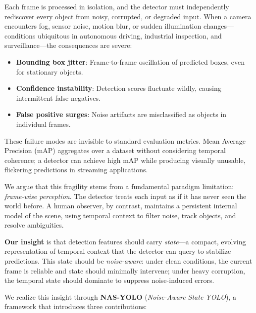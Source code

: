 \documentclass[review]{eccv2026}
\begin{document}
Each frame is processed in isolation, and the detector must independently rediscover every object from noisy, corrupted, or degraded input.
When a camera encounters fog, sensor noise, motion blur, or sudden illumination changes---conditions ubiquitous in autonomous driving, industrial inspection, and surveillance---the consequences are severe:
\begin{itemize}[leftmargin=1.5em,topsep=2pt,itemsep=1pt]
  \item \textbf{Bounding box jitter}: Frame-to-frame oscillation of predicted boxes, even for stationary objects.
  \item \textbf{Confidence instability}: Detection scores fluctuate wildly, causing intermittent false negatives.
  \item \textbf{False positive surges}: Noise artifacts are misclassified as objects in individual frames.
\end{itemize}
These failure modes are invisible to standard evaluation metrics.
Mean Average Precision (mAP) aggregates over a dataset without considering temporal coherence; a detector can achieve high mAP while producing visually unusable, flickering predictions in streaming applications.

We argue that this fragility stems from a fundamental paradigm limitation: \textit{frame-wise perception}.
The detector treats each input as if it has never seen the world before.
A human observer, by contrast, maintains a persistent internal model of the scene, using temporal context to filter noise, track objects, and resolve ambiguities.

\textbf{Our insight} is that detection features should carry \textit{state}---a compact, evolving representation of temporal context that the detector can query to stabilize predictions.
This state should be \textit{noise-aware}: under clean conditions, the current frame is reliable and state should minimally intervene; under heavy corruption, the temporal state should dominate to suppress noise-induced errors.

We realize this insight through \textbf{NAS-YOLO} (\textit{Noise-Aware State YOLO}), a framework that introduces three contributions:
\end{document}
